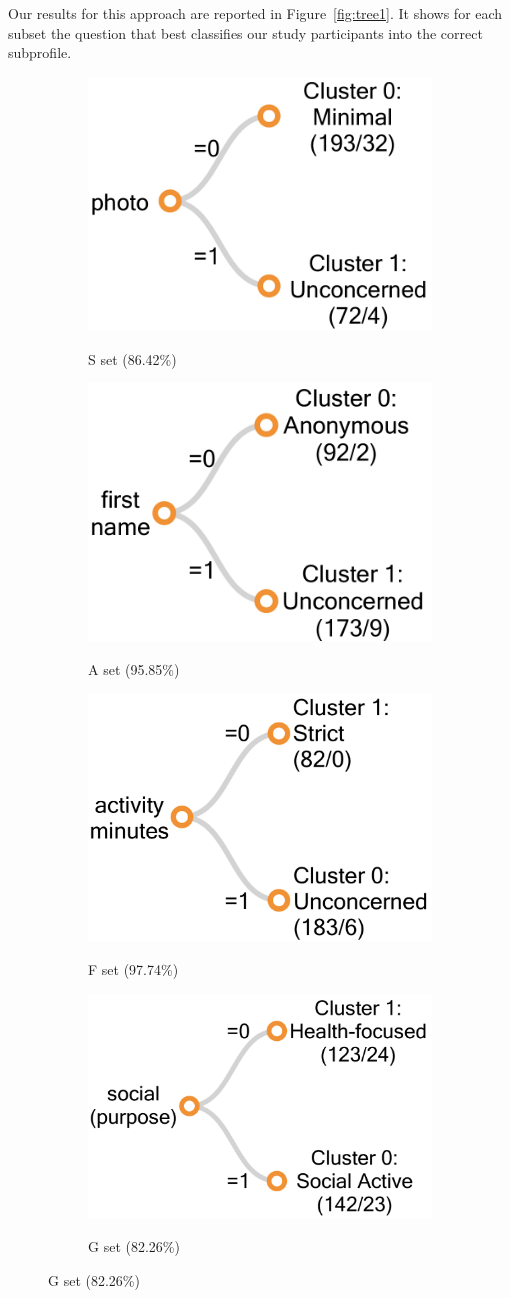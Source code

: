 Our results for this approach are reported in Figure~\ref{fig:tree1}. It shows for each subset the question that best classifies our study participants into the correct subprofile.

\begin{figure}
	\centering
	\begin{subfigure}[b]{0.4\linewidth}
		\includegraphics[width=0.5\linewidth]{figures/s_tree1new.png}
		\label{fig:stree1}
		\caption{S set (86.42\%)}
	\end{subfigure}
	\begin{subfigure}[b]{0.4\linewidth}
		\includegraphics[width=0.5\linewidth]{figures/a_tree1new.png}
		\label{fig:atree1}
		\caption{A set (95.85\%)}
	\end{subfigure}
	\begin{subfigure}[b]{0.4\linewidth}
		\includegraphics[width=0.5\linewidth]{figures/f_tree1new.png}
		\label{fig:ftree1}
		\caption{F set (97.74\%)}
	\end{subfigure}	
 	\begin{subfigure}[b]{0.4\linewidth}
	 	\includegraphics[width=0.5\linewidth]{figures/g_tree1new.png}
	 	\label{fig:gtree1}
	 \caption{G set (82.26\%)}
	\end{subfigure}


\end{figure}
